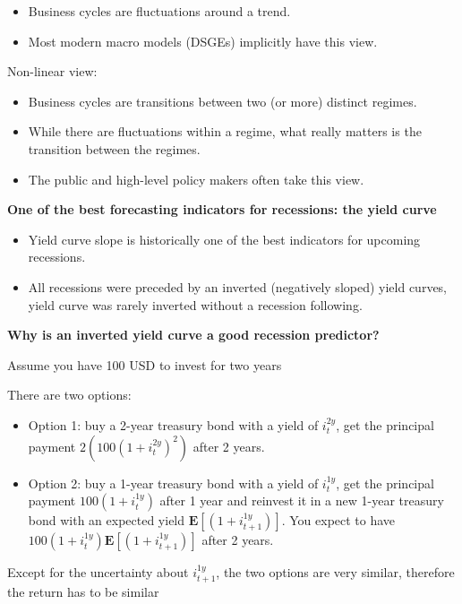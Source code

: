 \documentclass{article}
\begin{document}
\begin{itemize}
    \item Business cycles are fluctuations around a trend.
    \item Most modern macro models (DSGEs) implicitly have this view.
\end{itemize}

Non-linear view:

\begin{itemize}
    \item Business cycles are transitions between two (or more) distinct regimes.
    \item While there are fluctuations within a regime, what really matters is the transition between the regimes.
    \item The public and high-level policy makers often take this view.
\end{itemize}

\textbf{One of the best forecasting indicators for recessions: the yield curve}

\begin{itemize}
    \item Yield curve slope is historically one of the best indicators for upcoming recessions.
    \item All recessions were preceded by an inverted (negatively sloped) yield curves, yield curve was rarely inverted without a recession following.
\end{itemize}

\textbf{Why is an inverted yield curve a good recession predictor?}

Assume you have 100 USD to invest for two years

There are two options:

\begin{itemize}
    \item Option 1: buy a 2-year treasury bond with a yield of $i_t^{2y}$, get the principal payment $2(100(1+i_t^{2y})^2)$ after 2 years.
    \item Option 2: buy a 1-year treasury bond with a yield of $i_t^{1y}$, get the principal payment $100(1+i_t^{1y})$ after 1 year and reinvest it in a new 1-year treasury bond with an expected yield $\mathbf{E}\left[(1+i_{t+1}^{1y})\right]$. You expect to have $100(1+i_t^{1y})\mathbf{E}\left[(1+i_{t+1}^{1y})\right]$ after 2 years.
\end{itemize}

Except for the uncertainty about $i_{t+1}^{1y}$, the two options are very similar, therefore the return has to be similar
\end{document}
